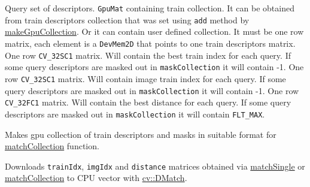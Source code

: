 
\begin{description}
 {Query set of descriptors.}
 {\texttt{GpuMat} containing train collection. It can be obtained from train descriptors collection that was set using \texttt{add} method by \hyperref[cppfunc.gpu.BruteForceMatcher.makeGpuCollection]{makeGpuCollection}. Or it can contain user defined collection. It must be one row matrix, each element is a \texttt{DevMem2D} that points to one train descriptors matrix.}
 {One row \texttt{CV\_32SC1} matrix. Will contain the best train index for each query. If some query descriptors are masked out in \texttt{maskCollection} it will contain -1.}
 {One row \texttt{CV\_32SC1} matrix. Will contain image train index for each query. If some query descriptors are masked out in \texttt{maskCollection} it will contain -1.}
 {One row \texttt{CV\_32FC1} matrix. Will contain the best distance for each query. If some query descriptors are masked out in \texttt{maskCollection} it will contain \texttt{FLT\_MAX}.}
\end{description}


\label{cppfunc.gpu.BruteForceMatcher.makeGpuCollection}
Makes gpu collection of train descriptors and masks in suitable format for \hyperref[cppfunc.gpu.BruteForceMatcher.matchCollection]{matchCollection} function.



\label{cppfunc.gpu.BruteForceMatcher.matchDownload}
Downloads \texttt{trainIdx}, \texttt{imgIdx} and \texttt{distance} matrices obtained via \hyperref[cppfunc.gpu.BruteForceMatcher.matchSingle]{matchSingle} or \hyperref[cppfunc.gpu.BruteForceMatcher.matchCollection]{matchCollection} to CPU vector with \hyperref[cv.class.DMatch]{cv::DMatch}.


